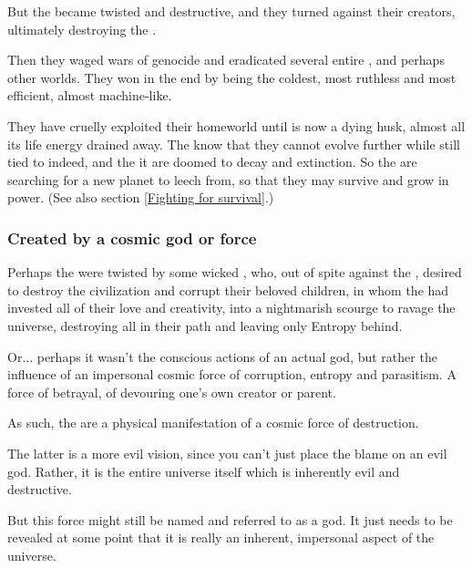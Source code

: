 But the \banes{} became twisted and destructive, and they turned against their creators, ultimately destroying the \voyagers. 

Then they waged wars of genocide and eradicated several entire , and perhaps other worlds. They won in the end by being the coldest, most ruthless and most efficient, almost machine-like. 

They have cruelly exploited their homeworld until \Erebos{} is now a dying husk, almost all its life energy drained away. The \banes{} know that they cannot evolve further while still tied to \Erebos\dash indeed, \Erebos{} and the \banes{} it are doomed to decay and extinction. So the \banes{} are searching for a new planet to leech from, so that they may survive and grow in power. (See also section \ref{Fighting for survival}.)





\subsubsection{Created by a cosmic god or force}
Perhaps the \banes{} were twisted by some wicked , who, out of spite against the \voyagers, desired to destroy the \psp{\voyagers} civilization and corrupt their beloved children, in whom the \voyagers{} had invested all of their love and creativity, into a nightmarish scourge to ravage the universe, destroying all in their path and leaving only Entropy behind. 

Or... perhaps it wasn't the conscious actions of an actual god, but rather the influence of an impersonal cosmic force of corruption, entropy and parasitism. 
A force of betrayal, of devouring one's own creator or parent. 

As such, the \banes{} are a physical manifestation of a cosmic force of destruction. 

The latter is a more evil vision, since you can't just place the blame on an evil god. 
Rather, it is the entire universe itself which is inherently evil and destructive. 

But this force might still be named and referred to as a god. 
It just needs to be revealed at some point that it is really an inherent, impersonal aspect of the universe.

